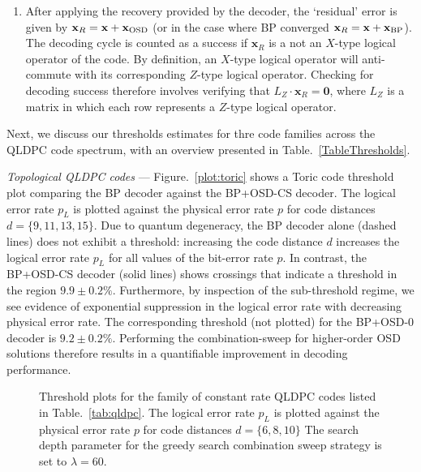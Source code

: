 \documentclass[%
 reprint,
superscriptaddress,
nofootinbib,
 amsmath,amssymb,
secnumarabic
]{revtex4-1}
\newcommand*{\etc}[1]{{#1}}
\begin{document}
\begin{enumerate}
	\item After applying the recovery provided by the decoder, the `residual' error is given by $\mathbf{x}_R=\mathbf{x} + \mathbf{x}_{\rm OSD}$ (or in the case where BP converged $\mathbf{x}_R=\mathbf{x} + \mathbf{x}_{\rm BP}$). The decoding cycle is counted as a success if $\mathbf{x}_R$ is a not an $X$-type logical operator of the code. By definition, an $X$-type logical operator will anti-commute with its corresponding $Z$-type logical operator. Checking for decoding success therefore involves verifying that $L_Z\cdot \mathbf{x}_R=\mathbf{0}$, where $L_Z$ is a matrix in which each row represents a $Z$-type logical operator. 
		
		
		

	 
\end{enumerate}
%
\etc{Next, we discuss our thresholds estimates for thre code families across the QLDPC code spectrum, with an overview presented in Table.~\ref{TableThresholds}.}

\textit{Topological QLDPC codes} --- Figure.~\ref{plot:toric} shows a Toric code threshold plot comparing the BP decoder against the BP+OSD-CS decoder. The logical error rate $p_L$ is plotted against the physical error rate $p$ for code distances $d=\{9,11,13,15\}$. Due to quantum degeneracy, the BP decoder alone (dashed lines) does not exhibit a threshold: increasing the code distance $d$ increases the logical error rate $p_L$ for all values of the bit-error rate $p$. In contrast, the BP+OSD-CS decoder (solid lines) shows crossings that indicate a threshold in the region $9.9\pm0.2\%$. Furthermore, by inspection of the sub-threshold regime, we see evidence of exponential suppression in the logical error rate with decreasing physical error rate. The corresponding threshold (not plotted) for the BP+OSD-0 decoder is $9.2\pm0.2\%$. Performing the combination-sweep for higher-order OSD solutions therefore results in a quantifiable improvement in decoding performance.


\begin{figure}
	
	\caption{Threshold plots for the family of constant rate QLDPC codes listed in Table.~\ref{tab:qldpc}. The logical error rate $p_L$ is plotted against the physical error rate $p$ for code distances $d=\{6,8,10\}$ The search depth parameter for the greedy search combination sweep strategy is set to $\lambda=60$.}
	\label{plot:qldpc}
\end{figure}
\end{document}
